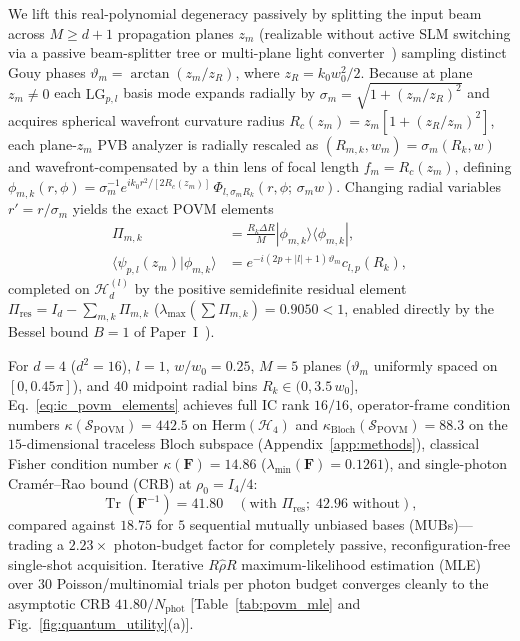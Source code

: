 \documentclass[aps,pra,reprint,nofootinbib,floatfix,longbibliography]{revtex4-2}
\newcommand{\braket}[2]{\langle #1 | #2 \rangle}
\newcommand{\ket}[1]{| #1 \rangle}
\newcommand{\bra}[1]{\langle #1 |}
\newcommand{\abs}[1]{\lvert #1 \rvert}
\begin{document}
We lift this real-polynomial degeneracy passively by splitting the input beam across $M \ge d+1$ propagation planes $z_m$ (realizable without active SLM switching via a passive beam-splitter tree or multi-plane light converter~\cite{Fontaine2019,Bouchard2018}) sampling distinct Gouy phases $\vartheta_m = \arctan(z_m/z_R)$, where $z_R = k_0 w_0^2/2$. Because at plane $z_m \neq 0$ each $\mathrm{LG}_{p,l}$ basis mode expands radially by $\sigma_m = \sqrt{1 + (z_m/z_R)^2}$ and acquires spherical wavefront curvature radius $R_c(z_m) = z_m[1 + (z_R/z_m)^2]$, each plane-$z_m$ PVB analyzer is radially rescaled as $(R_{m,k}, w_m) = \sigma_m(R_k, w)$ and wavefront-compensated by a thin lens of focal length $f_m = R_c(z_m)$, defining $\phi_{m,k}(r,\phi) = \sigma_m^{-1} e^{ik_0 r^2/[2R_c(z_m)]}\,\Phi_{l,\sigma_m R_k}(r,\phi;\,\sigma_m w)$. Changing radial variables $r' = r/\sigma_m$ yields the exact POVM elements~\cite{Renes2004}
\begin{align}
\Pi_{m,k} &= \frac{R_k \Delta R}{M}\ket{\phi_{m,k}}\bra{\phi_{m,k}}, \nonumber \\
\braket{\psi_{p,l}(z_m)}{\phi_{m,k}} &= e^{-i(2p+\abs{l}+1)\vartheta_m} c_{l,p}(R_k),
\label{eq:ic_povm_elements}
\end{align}
completed on $\mathcal{H}_d^{(l)}$ by the positive semidefinite residual element $\Pi_{\mathrm{res}} = I_d - \sum_{m,k}\Pi_{m,k}$ ($\lambda_{\max}(\sum \Pi_{m,k}) = 0.9050 < 1$, enabled directly by the Bessel bound $B = 1$ of Paper~I~\cite{AyalaPaperI}).

For $d = 4$ ($d^2 = 16$), $l = 1$, $w/w_0 = 0.25$, $M = 5$ planes ($\vartheta_m$ uniformly spaced on $[0, 0.45\pi]$), and $40$ midpoint radial bins $R_k \in (0, 3.5\,w_0]$, Eq.~\eqref{eq:ic_povm_elements} achieves full IC rank $16/16$, operator-frame condition numbers $\kappa(\mathcal{S}_{\mathrm{POVM}}) = 442.5$ on $\mathrm{Herm}(\mathcal{H}_4)$ and $\kappa_{\mathrm{Bloch}}(\mathcal{S}_{\mathrm{POVM}}) = 88.3$ on the $15$-dimensional traceless Bloch subspace (Appendix~\ref{app:methods}), classical Fisher condition number $\kappa(\mathbf{F}) = 14.86$ ($\lambda_{\min}(\mathbf{F}) = 0.1261$), and single-photon Cram\'er--Rao bound (CRB) at $\rho_0 = I_4/4$:
\begin{equation}
\operatorname{Tr}\!\left(\mathbf{F}^{-1}\right) = 41.80 \quad (\text{with }\Pi_{\mathrm{res}};\; 42.96\text{ without}),
\label{eq:fisher_crb}
\end{equation}
compared against $18.75$ for $5$ sequential mutually unbiased bases (MUBs)—trading a $2.23\times$ photon-budget factor for completely passive, reconfiguration-free single-shot acquisition. Iterative $R\hat{\rho}R$ maximum-likelihood estimation (MLE)~\cite{Lvovsky2004} over $30$ Poisson/multinomial trials per photon budget converges cleanly to the asymptotic CRB $41.80/N_{\mathrm{phot}}$ [Table~\ref{tab:povm_mle} and Fig.~\ref{fig:quantum_utility}(a)].
\end{document}
